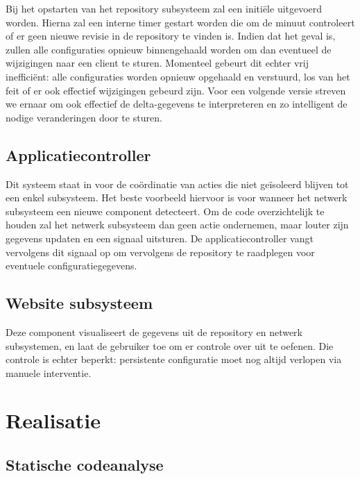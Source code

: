 Bij het opstarten van het repository subsysteem zal een initiële  uitgevoerd worden. Hierna zal een interne timer gestart worden die om de minuut controleert of er geen nieuwe revisie in de repository te vinden is. Indien dat het geval is, zullen alle configuraties opnieuw binnengehaald worden om dan eventueel de wijzigingen naar een client te sturen. Momenteel gebeurt dit echter vrij inefficiënt: alle configuraties worden opnieuw opgehaald en verstuurd, los van het feit of er ook effectief wijzigingen gebeurd zijn. Voor een volgende versie streven we ernaar om ook effectief de delta-gegevens te interpreteren en zo intelligent de nodige veranderingen door te sturen.

\section{Applicatiecontroller}
\label{server:structuur:controller}

Dit systeem staat in voor de coördinatie van acties die niet geïsoleerd blijven tot een enkel subsysteem. Het beste voorbeeld hiervoor is voor wanneer het netwerk subsysteem een nieuwe component detecteert. Om de code overzichtelijk te houden zal het netwerk subsysteem dan geen actie ondernemen, maar louter zijn gegevens updaten en een signaal uitsturen. De applicatiecontroller vangt vervolgens dit signaal op om vervolgens de repository te raadplegen voor eventuele configuratiegegevens.

\section{Website subsysteem}
\label{server:structuur:website}

Deze component visualiseert de gegevens uit de repository en netwerk subsystemen, en laat de gebruiker toe om er controle over uit te oefenen. Die controle is echter beperkt: persistente configuratie moet nog altijd verlopen via manuele interventie.

\chapter{Realisatie}
\label{server:realisatie}

\section{Statische codeanalyse}
\label{server:realisatie:codeanalyse}

